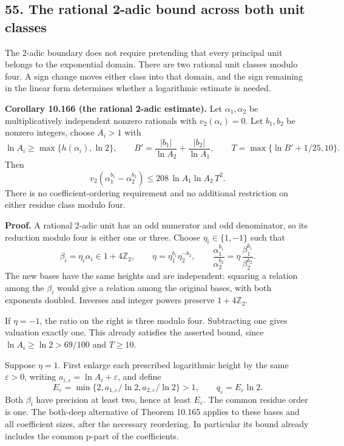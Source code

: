 \documentclass[
  11pt,
  a4paper,
]{article}
\begin{document}
\subsection{55. The rational 2-adic bound across both unit
classes}\label{the-rational-2-adic-bound-across-both-unit-classes}

The 2-adic boundary does not require pretending that every principal
unit belongs to the exponential domain. There are two rational unit
classes modulo four. A sign change moves either class into that domain,
and the sign remaining in the linear form determines whether a
logarithmic estimate is needed.

\textbf{Corollary 10.166 (the rational 2-adic estimate).} Let
\(\alpha_1,\alpha_2\) be multiplicatively independent nonzero rationals
with \(v_2(\alpha_i)=0\). Let \(b_1,b_2\) be nonzero integers, choose
\(A_i>1\) with \[
\ln A_i\ge\max\{h(\alpha_i),\ln2\},
\qquad B'=\frac{|b_1|}{\ln A_2}+\frac{|b_2|}{\ln A_1},
\qquad T=\max\{\ln B'+1/25,10\}.
\tag{10.575}
\] Then \[
v_2(\alpha_1^{b_1}-\alpha_2^{b_2})
\le208\,\ln A_1\ln A_2\,T^2.
\tag{10.576}
\] There is no coefficient-ordering requirement and no additional
restriction on either residue class modulo four.

\textbf{Proof.} A rational 2-adic unit has an odd numerator and odd
denominator, so its reduction modulo four is either one or three. Choose
\(\eta_i\in\{1,-1\}\) such that \[
\beta_i=\eta_i\alpha_i\in1+4\mathbb Z_2,\qquad
\eta=\eta_1^{b_1}\eta_2^{-b_2},\qquad
\frac{\alpha_1^{b_1}}{\alpha_2^{b_2}}
=\eta\,\frac{\beta_1^{b_1}}{\beta_2^{b_2}}.
\tag{10.577}
\] The new bases have the same heights and are independent: squaring a
relation among the \(\beta_i\) would give a relation among the original
bases, with both exponents doubled. Inverses and integer powers preserve
\(1+4\mathbb Z_2\).

If \(\eta=-1\), the ratio on the right is three modulo four. Subtracting
one gives valuation exactly one. This already satisfies the asserted
bound, since \(\ln A_i\ge\ln2>69/100\) and \(T\ge10\).

Suppose \(\eta=1\). First enlarge each prescribed logarithmic height by
the same \(\varepsilon>0\), writing
\(a_{i,\varepsilon}=\ln A_i+\varepsilon\), and define \[
E_\varepsilon=\min\{2,a_{1,\varepsilon}/\ln2,a_{2,\varepsilon}/\ln2\}>1,
\qquad q_\varepsilon=E_\varepsilon\ln2.
\tag{10.578}
\] Both \(\beta_i\) have precision at least two, hence at least
\(E_\varepsilon\). The common residue order is one. The both-deep
alternative of Theorem 10.165 applies to these bases and all coefficient
sizes, after the necessary reordering. In particular its bound already
includes the common p-part of the coefficients.
\end{document}
